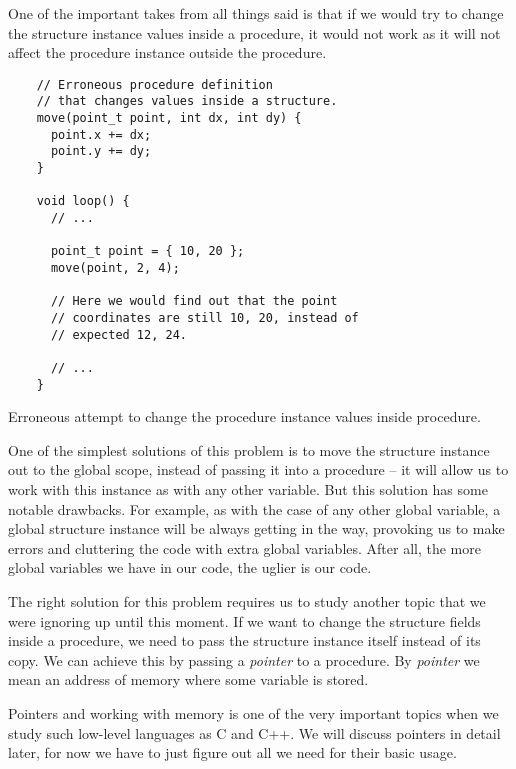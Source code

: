 \documentclass[../sparc.tex]{subfiles}
\begin{document}
One of the important takes from all things said is that if we would try to
change the structure instance values inside a procedure, it would not work as it
will not affect the procedure instance outside the procedure.

\begin{listing}[H]
  \begin{verbatim}
    // Erroneous procedure definition
    // that changes values inside a structure.
    move(point_t point, int dx, int dy) {
      point.x += dx;
      point.y += dy;
    }

    void loop() {
      // ...

      point_t point = { 10, 20 };
      move(point, 2, 4);

      // Here we would find out that the point
      // coordinates are still 10, 20, instead of
      // expected 12, 24.

      // ...
    }
  \end{verbatim}
  \caption{Erroneous attempt to change the procedure instance values inside
    procedure.}
  \label{listing:game-dev-structure-usage-01}
\end{listing}

One of the simplest solutions of this problem is to move the structure instance
out to the global scope, instead of passing it into a procedure -- it will allow
us to work with this instance as with any other variable.  But this solution has
some notable drawbacks.  For example, as with the case of any other global
variable, a global structure instance will be always getting in the way,
provoking us to make errors and cluttering the code with extra global variables.
After all, the more global variables we have in our code, the uglier is our
code.

 The right solution for this problem requires us to
study another topic that we were ignoring up until this moment.  If we want to
change the structure fields inside a procedure, we need to pass the structure
instance itself instead of its copy.  We can achieve this by passing a
\emph{pointer} to a procedure.  By \emph{pointer} we mean an address of memory
where some variable is stored.

Pointers and working with memory is one of the very important topics when we
study such low-level languages as C and C++.  We will discuss pointers in detail
later, for now we have to just figure out all we need for their basic usage.
\end{document}
